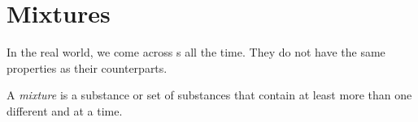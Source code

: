 \section{Mixtures}\label{sec:Mixtures}
In the real world, we come across s all the time.
They do not have the same properties as their  counterparts.

\begin{definition}[Mixture]\label{def:Mixture}
  A \emph{mixture} is a substance or set of substances that contain at least more than one different  and  at a time.
\end{definition}


